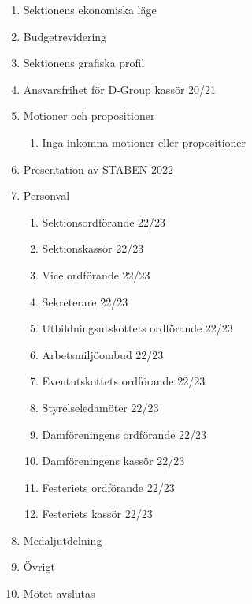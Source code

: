 \documentclass{datateknologsektionen-document}
\begin{document}
\begin{enumerate}[topsep=0pt,itemsep=1ex]
  \item Sektionens ekonomiska läge
  \item Budgetrevidering
  \item Sektionens grafiska profil
  \item Ansvarsfrihet för D-Group kassör 20/21
  \item Motioner och propositioner
        \begin{enumerate}[label*=\arabic*.,leftmargin=3em]
          \item Inga inkomna motioner eller propositioner
        \end{enumerate}
  \item Presentation av STABEN 2022
  \item Personval
        \begin{enumerate}[label*=\arabic*.,leftmargin=3em]
          \item Sektionsordförande 22/23
          \item Sektionskassör 22/23
          \item Vice ordförande 22/23
          \item Sekreterare 22/23
          \item Utbildningsutskottets ordförande 22/23
          \item Arbetsmiljöombud 22/23
          \item Eventutskottets ordförande 22/23
          \item Styrelseledamöter 22/23
          \item Damföreningens ordförande 22/23
          \item Damföreningens kassör 22/23
          \item Festeriets ordförande 22/23
          \item Festeriets kassör 22/23
        \end{enumerate}
  \item Medaljutdelning
  \item Övrigt
  \item Mötet avslutas
\end{enumerate}
\end{document}
